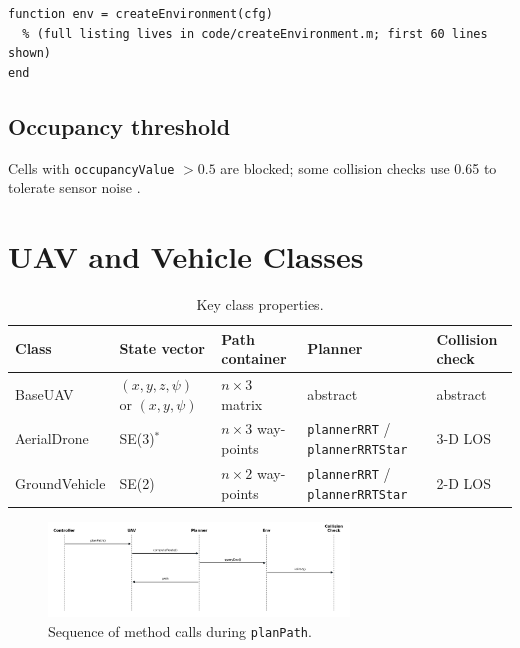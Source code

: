 \documentclass[12pt,a4paper]{report}
\begin{document}
\begin{verbatim}
function env = createEnvironment(cfg)
  % (full listing lives in code/createEnvironment.m; first 60 lines shown)
end
\end{verbatim}

\subsection*{Occupancy threshold}
Cells with \texttt{occupancyValue} \(>\!0.5\) are blocked; some collision checks use
0.65 to tolerate sensor noise \cite{Merei2025UAVObstacleSurvey}.

\section{UAV and Vehicle Classes}
\label{sec:uav_classes}

\begin{table}[h]
  \centering
  \caption{Key class properties.}
  \label{tab:uavProps}
  \begin{tabular}{lllll}
    \toprule
    \textbf{Class} & \textbf{State vector} & \textbf{Path container} &
    \textbf{Planner} & \textbf{Collision check} \\
    \midrule
    BaseUAV &
      \((x,y,z,\psi)\) or \((x,y,\psi)\) &
      $n{\times}3$ matrix &
      abstract &
      abstract \\[2pt]
    AerialDrone &
      SE(3)\(^*\) &
      $n{\times}3$ way-points &
      \texttt{plannerRRT} / \texttt{plannerRRTStar} &
      3-D LOS \\[2pt]
    GroundVehicle &
      SE(2) &
      $n{\times}2$ way-points &
      \texttt{plannerRRT} / \texttt{plannerRRTStar} &
      2-D LOS \\
    \bottomrule
  \end{tabular}
\end{table}

\begin{figure}[h]
  \centering
  \includegraphics[width=8cm]{figures/seq_planPath}
  \caption{Sequence of method calls during \texttt{planPath}.}
  \label{fig:seqPlanPath}
\end{figure}
\end{document}
